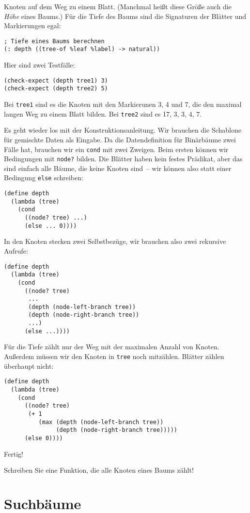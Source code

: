 Knoten auf dem Weg zu einem Blatt.  (Manchmal heißt diese Größe auch
die \textit{Höhe} eines Baums.)  Für die Tiefe
des Baums sind die Signaturen der Blätter und Markierungen egal:
%
\begin{lstlisting}
; Tiefe eines Baums berechnen
(: depth ((tree-of %leaf %label) -> natural))
\end{lstlisting}
%
Hier sind zwei Testfälle:
%
\begin{lstlisting}
(check-expect (depth tree1) 3)
(check-expect (depth tree2) 5)
\end{lstlisting}
%
Bei \lstinline{tree1} sind es die Knoten mit den Markierunen 3, 4 und
7, die den maximal langen Weg zu einem Blatt bilden.  Bei
\lstinline{tree2} sind es 17, 3, 3, 4, 7.

Es geht wieder los mit der Konstruktionsanleitung.  Wir brauchen die
Schablone für gemischte Daten als Eingabe.  Da die Datendefinition für
Binärbäume zwei Fälle hat, brauchen wir ein \lstinline{cond} mit zwei
Zweigen.  Beim ersten können wir Bedingungen mit \lstinline{node?}
bilden.  Die Blätter haben kein festes Prädikat, aber das sind einfach
alle Bäume, die keine Knoten sind~-- wir können also statt einer
Bedingung \lstinline{else} schreiben:
%
\begin{lstlisting}
(define depth
  (lambda (tree)
    (cond
      ((node? tree) ...)
      (else ... 0))))
\end{lstlisting}
%
In den Knoten stecken zwei Selbstbezüge, wir brauchen also zwei
rekursive Aufrufe:
%
\begin{lstlisting}
(define depth
  (lambda (tree)
    (cond
      ((node? tree)
       ...
       (depth (node-left-branch tree))
       (depth (node-right-branch tree))
       ...)
      (else ...))))
\end{lstlisting}
%
Für die Tiefe zählt nur der Weg mit der maximalen Anzahl von Knoten.
Außerdem müssen wir den Knoten in \lstinline{tree} noch mitzählen.
Blätter zählen überhaupt nicht:
%
\begin{lstlisting}
(define depth
  (lambda (tree)
    (cond
      ((node? tree)
       (+ 1
          (max (depth (node-left-branch tree))
               (depth (node-right-branch tree)))))
      (else 0))))
\end{lstlisting}
%
Fertig!
%
\begin{aufgabeinline}
  Schreiben Sie eine Funktion, die alle Knoten eines Baums zählt!
\end{aufgabeinline}

\section{Suchbäume}
\label{sec:search-trees}

